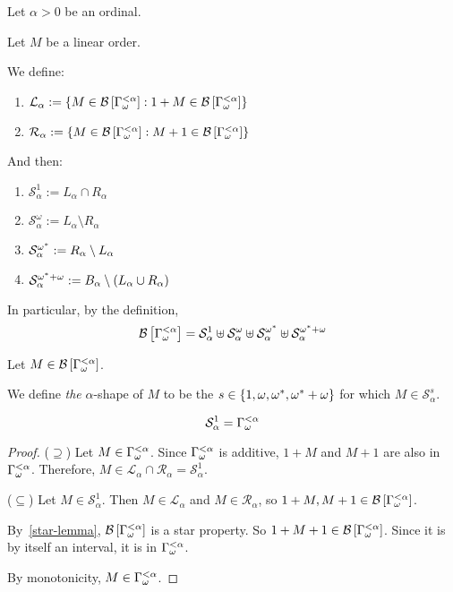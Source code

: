 \begin{definitions}
  Let $\alpha > 0$ be an ordinal.

  Let $M$ be a linear order.

  We define:
  \begin{enumerate}
    \item $\mathcal{L}_{\alpha} := \left\{ {M \in \mathcal{B} \left[ {{\Gamma_{\omega}^{< \alpha}}} \right] : 1 + M \in \mathcal{B} \left[ {{\Gamma_{\omega}^{< \alpha}}} \right]} \right\}$
    \item $\mathcal{R}_{\alpha} := \left\{ {M \in \mathcal{B} \left[ {{\Gamma_{\omega}^{< \alpha}}} \right] : M + 1 \in \mathcal{B} \left[ {{\Gamma_{\omega}^{< \alpha}}} \right]} \right\}$
  \end{enumerate}

  And then:
  \begin{enumerate}
    \item $\mathcal{S}^{1}_{\alpha} := L_{\alpha} \cap R_{\alpha}$
    \item $\mathcal{S}^{\omega}_{\alpha} := L_{\alpha} \setminus R_{\alpha}$
    \item $\mathcal{S}^{\omega^\ast}_{\alpha} := R_{\alpha} \setminus L_{\alpha}$
    \item $\mathcal{S}^{\omega^\ast + \omega}_{\alpha} := B_{\alpha} \setminus (L_{\alpha} \cup R_{\alpha})$
  \end{enumerate}

  In particular, by the definition,
  \[
    \mathcal{B} \left[ {{\Gamma_{\omega}^{< \alpha}}} \right]
    = \mathcal{S}^{1}_{\alpha}
    \uplus \mathcal{S}^{\omega}_{\alpha}
    \uplus \mathcal{S}^{\omega^\ast}_{\alpha}
    \uplus \mathcal{S}^{\omega^\ast + \omega}_{\alpha}
  \]

  Let $M \in \mathcal{B} \left[ {{\Gamma_{\omega}^{< \alpha}}} \right]$.
  
  We define \emph{the} $\alpha$-shape
  of $M$ to be the $s \in \left\{ {1, \omega, \omega^\ast, \omega^\ast + \omega} \right\}$
  for which $M \in \mathcal{S}^{s}_{\alpha}$.
\end{definitions}

\begin{lemma}
  \[
    \mathcal{S}^{1}_{\alpha} = \Gamma_{\omega}^{< \alpha}
  \]
\end{lemma}

\begin{proof}
  ($\supseteq$) Let $M \in \Gamma_{\omega}^{< \alpha}$.
  Since $\Gamma_{\omega}^{< \alpha}$ is additive, $1 + M$ and $M + 1$ are also in $\Gamma_{\omega}^{< \alpha}$.
  Therefore, $M \in \mathcal{L}_{\alpha} \cap \mathcal{R}_{\alpha}
  = \mathcal{S}^{1}_{\alpha}$.

  ($\subseteq$) Let $M \in \mathcal{S}^{1}_{\alpha}$.
  Then $M \in \mathcal{L}_{\alpha}$ and $M \in \mathcal{R}_{\alpha}$,
  so $1 + M, M + 1 \in \mathcal{B} \left[ {{\Gamma_{\omega}^{< \alpha}}} \right]$.

  By~\cref{star-lemma}, $\mathcal{B} \left[ {{\Gamma_{\omega}^{< \alpha}}} \right]$ is a star property.
  So $1 + M + 1 \in \mathcal{B} \left[ {{\Gamma_{\omega}^{< \alpha}}} \right]$. Since it is by itself
  an interval, it is in $\Gamma_{\omega}^{< \alpha}$.

  By monotonicity, $M \in \Gamma_{\omega}^{< \alpha}$.
\end{proof}

